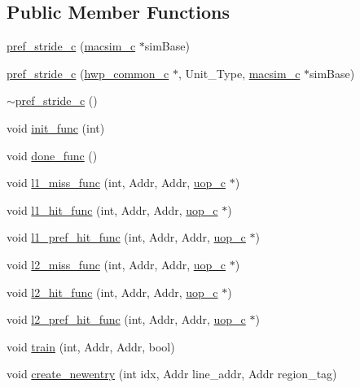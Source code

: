 \subsection*{Public Member Functions}
\begin{DoxyCompactItemize}
\item 
\hyperlink{classpref__stride__c_a0c7831df021d2e585b268dd0605ba852}{pref\_\-stride\_\-c} (\hyperlink{classmacsim__c}{macsim\_\-c} $\ast$simBase)
\item 
\hyperlink{classpref__stride__c_ada308e1e3ce5736adf52e46cd10327dd}{pref\_\-stride\_\-c} (\hyperlink{classhwp__common__c}{hwp\_\-common\_\-c} $\ast$, Unit\_\-Type, \hyperlink{classmacsim__c}{macsim\_\-c} $\ast$simBase)
\item 
\hyperlink{classpref__stride__c_ad5d7b93da62f373b582b79d5ac4bbc25}{$\sim$pref\_\-stride\_\-c} ()
\item 
void \hyperlink{classpref__stride__c_a09ed6d4a95388ec667244be7d977eea2}{init\_\-func} (int)
\item 
void \hyperlink{classpref__stride__c_a147e597a5eb20dc3b903c3c5eaf8973b}{done\_\-func} ()
\item 
void \hyperlink{classpref__stride__c_a7a75dcfa0945e493306b41b7f7d807f6}{l1\_\-miss\_\-func} (int, Addr, Addr, \hyperlink{classuop__c}{uop\_\-c} $\ast$)
\item 
void \hyperlink{classpref__stride__c_a9021353112572858151e53b6c96df0b8}{l1\_\-hit\_\-func} (int, Addr, Addr, \hyperlink{classuop__c}{uop\_\-c} $\ast$)
\item 
void \hyperlink{classpref__stride__c_aeb8654a0fae97b42d1945d2b8f99c795}{l1\_\-pref\_\-hit\_\-func} (int, Addr, Addr, \hyperlink{classuop__c}{uop\_\-c} $\ast$)
\item 
void \hyperlink{classpref__stride__c_a4083ad3dba1bb8357c32f035a464de83}{l2\_\-miss\_\-func} (int, Addr, Addr, \hyperlink{classuop__c}{uop\_\-c} $\ast$)
\item 
void \hyperlink{classpref__stride__c_a7dfd002eebf50de73efe93b53c033044}{l2\_\-hit\_\-func} (int, Addr, Addr, \hyperlink{classuop__c}{uop\_\-c} $\ast$)
\item 
void \hyperlink{classpref__stride__c_acbaa296a61779db50bc2ff8b3807b434}{l2\_\-pref\_\-hit\_\-func} (int, Addr, Addr, \hyperlink{classuop__c}{uop\_\-c} $\ast$)
\item 
void \hyperlink{classpref__stride__c_a948578da09667bbb0ab8eade1a81780d}{train} (int, Addr, Addr, bool)
\item 
void \hyperlink{classpref__stride__c_a25bde09673728625928bb4c2bd5c2eaf}{create\_\-newentry} (int idx, Addr line\_\-addr, Addr region\_\-tag)
\end{DoxyCompactItemize}
